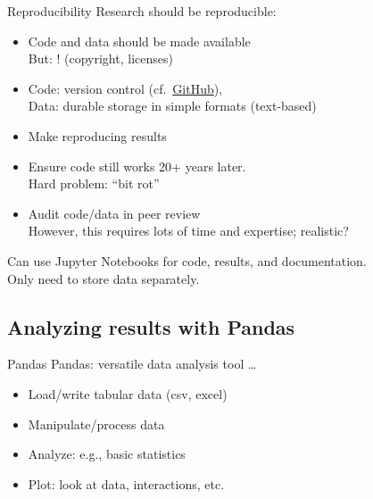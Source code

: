 \documentclass[aspectratio=169,usenames,dvipsnames]{beamer}
\begin{document}
\begin{frame}{Reproducibility}
    Research should be reproducible:

    \begin{itemize}
        \item Code and data should be made available \\
            But: ! (copyright, licenses)
        \item Code: version control (cf.\ \href{http://www.github.com}{GitHub}),\\
            Data: durable storage in simple formats (text-based)
        \item Make reproducing results 
        \item Ensure code still works 20+ years later. \\
            Hard problem: ``bit rot''
        \item Audit code/data in peer review \\
            However, this requires lots of time and expertise; realistic?
    \end{itemize}

    Can use Jupyter Notebooks for code, results, and documentation. \\
    Only need to store data separately.
\end{frame}


\subsection{Analyzing results with Pandas}
\frame{\tableofcontents[currentsubsection]}

\begin{frame}{Pandas}
    Pandas: versatile data analysis tool \dots

    \begin{itemize}
        \item Load/write tabular data (csv, excel)
        \item Manipulate/process data
        \item Analyze: e.g., basic statistics
        \item Plot: look at data, interactions, etc.
    \end{itemize}
\end{frame}
\end{document}
